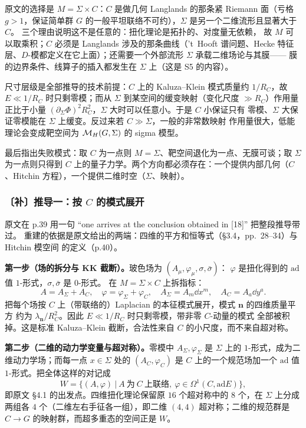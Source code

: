 原文的选择是 $M=\Sigma\times C$：$C$ 是做几何 Langlands 的那条紧 Riemann 面（亏格
$g>1$，保证简单群 $G$ 的一般平坦联络不可约），$\Sigma$ 是另一个二维流形且显著大于
$C$。\pA{} 三个理由说明这不是任意的：扭化理论是拓扑的、对度量无依赖，
故 $M$ 可以取乘积；$C$ 必须是 Langlands 涉及的那条曲线（'t~Hooft 谱问题、Hecke
特征层、$D$-模都定义在它上面）；还需要一个外部流形 $\Sigma$ 承载二维场论与其膜——
膜的边界条件、线算子的插入都发生在 $\Sigma$ 上（这是 S5 的内容）。

尺寸层级是全部推导的技术前提：$C$ 上的 Kaluza--Klein 模式质量约 $1/R_C$，故
$E\ll1/R_C$ 时只剩零模；而从 $\Sigma$ 到某空间的缓变映射（变化尺度 $\gg R_C$）作用量
正比于小量 $(\partial_\Sigma\Phi)^2R_C^2$，$\Sigma$ 大时可以任意小。于是 $C$ 小保证只有
零模、$\Sigma$ 大保证零模能在 $\Sigma$ 上缓变。反过来若 $C\gg\Sigma$，一般的非常数映射
作用量很大，低能理论会变成靶空间为 $\mathcal{M}_H(G,\Sigma)$ 的 sigma 模型。\pA{}

最后指出失败模式：取 $C$ 为一点则 $M=\Sigma$、靶空间退化为一点、无膜可谈；取 $\Sigma$
为一点则只得到 $C$ 上的量子力学。两个方向都必须存在：一个提供内部几何（$C$、Hitchin
方程），一个提供二维时空（$\Sigma$、映射）。

\subsubsection*{〔补〕推导一：按 $C$ 的模式展开}

原文在 p.39 用一句 “one arrives at the conclusion obtained in [18]” 把整段推导带过。
重建的依据是原文给出的两端：四维的平方和恒等式（§3.4，pp.~28--34）与 Hitchin 模空间
的定义（p.40）。\pB{}

\textbf{第一步（场的拆分与 KK 截断）。}玻色场为 $(A_\mu,\varphi_\mu,\sigma,\bar\sigma)$：
$\varphi$ 是扭化得到的 $\mathrm{ad}$ 值 $1$-形式，$\sigma,\bar\sigma$ 是 $0$-形式。
在 $M=\Sigma\times C$ 上拆指标：
\begin{equation}
A=A_\Sigma+A_C,\quad \varphi=\varphi_\Sigma+\varphi_C,\quad
A_\Sigma=A_m\dd x^m,\quad A_C=A_a\dd y^a .
\label{eq:split}
\end{equation}
把每个场按 $C$ 上（带联络的）Laplacian 的本征模式展开，模式 $\mathbf n$ 的四维质量平方
约为 $\lambda_{\mathbf n}/R_C^2$。因此 $E\ll1/R_C$ 时只剩零模，带非零 $C$-动量的模式
全部被积掉。这是标准 Kaluza--Klein 截断，合法性来自 $C$ 的小尺度，而不来自超对称。

\textbf{第二步（二维的动力学变量与超对称）。}零模中 $A_\Sigma,\varphi_\Sigma$ 是
$\Sigma$ 上的 $1$-形式，成为二维动力学场；而每一点 $x\in\Sigma$ 处的 $(A_C,\varphi_C)$
是 $C$ 上的一个规范场加一个 $\mathrm{ad}$ 值 $1$-形式。把全体这样的对记成
\begin{equation}
W=\bigl\{(A,\varphi)\ \big|\ A\ \text{为}\ C\ \text{上联络},\ 
\varphi\in\Omega^1(C,\mathrm{ad}E)\bigr\},
\label{eq:W}
\end{equation}
即原文 §4.1 的出发点。四维扭化理论保留原 $16$ 个超对称中的 $8$ 个，在 $\Sigma$ 上分成
两组各 $4$ 个（二维左右手征各一组），即二维 $(4,4)$ 超对称；二维的规范群是 $C\to G$
的映射群，而超多重态的空间正是 $W$。\pA{}


